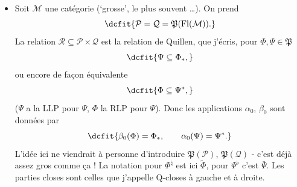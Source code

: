 \documentclass[11pt]{article}
\newcommand{\Fl}{\mathrm{Fl}}
\newcommand{\Pf}{\mathfrak{P}}
\begin{document}
\begin{itemize}[leftmargin=2.5em]
\item[6)] Soit $\mathcal{M}$ une catégorie (‘grosse’, le plus souvent \dots). On prend
\[
\dcfit{\mathcal{P}=\mathcal{Q}=\Pf(\Fl(\mathcal{M})).
}
\]
La relation $\mathcal{R}\subseteq\mathcal{P}\times\mathcal{Q}$ est la relation de Quillen, que j'écris, pour $\Phi,\Psi\in\Pf$
\[
\dcfit{\Psi\subseteq\Phi_{*},
}
\]
ou encore de façon équivalente
\[
\dcfit{\Phi\subseteq\Psi^{*},
}
\]
($\Psi$ a la LLP pour $\Psi$, $\Phi$ la RLP pour $\Psi$). Donc les applications $\alpha_0$, $\beta_0$ sont données par %
\[
\dcfit{\beta_0(\Phi)=\Phi_{*},\qquad \alpha_0(\Psi)=\Psi^{*}.
}
\]
L'idée ici ne viendrait à personne d'introduire $\Pf(\mathcal{P})$, $\Pf(\mathcal{Q})$ - c'est déjà assez gros comme ça ! La notation pour $\Phi^{\natural}$ est ici $\tilde{\Phi}$, pour $\Psi^{\flat}$ c'est $\bar{\Psi}$. Les parties closes sont celles que j'appelle Q-closes à gauche et à droite.


\end{itemize}
\end{document}
